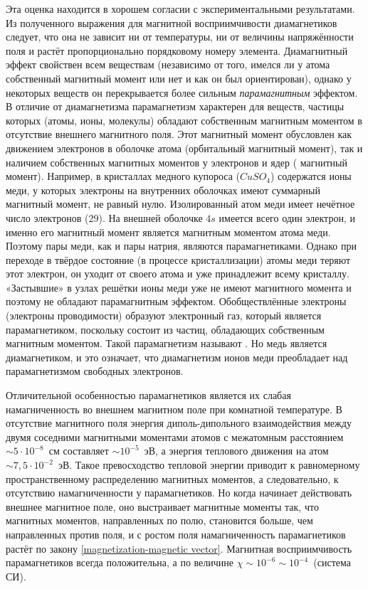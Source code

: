 Эта оценка находится в хорошем согласии с экспериментальными результатами.
Из полученного выражения для магнитной восприимчивости диамагнетиков следует, что она не зависит ни от температуры, ни от величины напряжённости поля и растёт пропорционально порядковому номеру элемента.
Диамагнитный эффект свойствен всем веществам (независимо от того, имелся ли у атома собственный магнитный момент или нет и как он был ориентирован), однако у некоторых веществ он перекрывается более сильным \emph{парамагнитным} эффектом. В отличие от диамагнетизма парамагнетизм характерен для веществ, частицы которых (атомы, ионы, молекулы) обладают собственным магнитным моментом в отсутствие внешнего магнитного поля. Этот магнитный момент обусловлен как движением электронов в оболочке атома (орбитальный магнитный момент), так и наличием собственных магнитных моментов у электронов и ядер ( магнитный момент). Например, в кристаллах медного купороса ($CuSO_4$) содержатся ионы меди, у которых электроны на внутренних оболочках имеют суммарный магнитный момент, не равный нулю. Изолированный атом меди имеет нечётное число электронов (29). На внешней оболочке $4s$ имеется всего один электрон, и именно его магнитный момент является магнитным моментом атома меди. Поэтому пары меди, как и пары натрия, являются парамагнетиками. Однако при переходе в твёрдое состояние (в процессе кристаллизации) атомы меди теряют этот электрон, он уходит от своего атома и уже принадлежит всему кристаллу. «Застывшие» в узлах решётки ионы меди уже не имеют магнитного момента и поэтому не обладают парамагнитным эффектом. Обобществлённые электроны (электроны проводимости) образуют электронный газ, который является парамагнетиком, поскольку состоит из частиц, обладающих собственным магнитным моментом. Такой парамагнетизм называют . Но медь является диамагнетиком, и это означает, что диамагнетизм ионов меди преобладает над парамагнетизмом свободных электронов.

Отличительной особенностью парамагнетиков является их слабая намагниченность во внешнем магнитном поле при комнатной температуре. В отсутствие магнитного поля энергия диполь-дипольного взаимодействия между двумя соседними магнитными моментами атомов с межатомным расстоянием $\sim 5 \cdot 10^{-8}$~см составляет $\sim 10^{-5}$~эВ, а энергия
теплового движения на атом $\sim 7,5 \cdot 10^{-2}$~эВ. Такое превосходство тепловой энергии приводит к равномерному пространственному распределению магнитных моментов, а следовательно, к отсутствию намагниченности у парамагнетиков. Но когда начинает действовать внешнее магнитное поле, оно выстраивает магнитные моменты так, что магнитных моментов, направленных по полю, становится больше, чем направленных против поля, и с ростом поля намагниченность парамагнетиков растёт по закону \eqref{magnetization-magnetic vector}.
Магнитная восприимчивость парамагнетиков всегда положительна, а по величине $\chi \sim 10^{-6} \sim 10^{-4}$~(система СИ).

